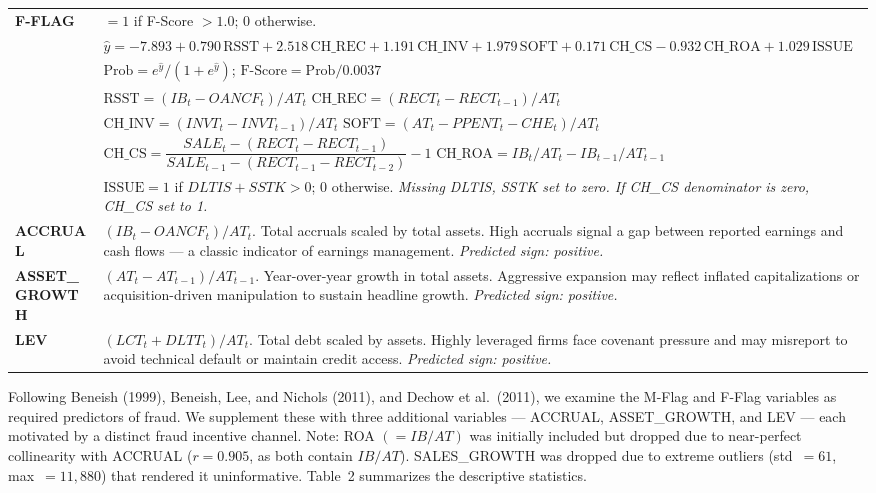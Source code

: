 \documentclass[12pt]{article}
\begin{document}
\begin{table}[h!]
\begin{tabular}{p{2.2cm} p{12.5cm}}
\textbf{F-FLAG} &
  $= 1$ if F-Score $> 1.0$; 0 otherwise.\\
  & $\hat{y} = -7.893 + 0.790\,\text{RSST} + 2.518\,\text{CH\_REC}
    + 1.191\,\text{CH\_INV} + 1.979\,\text{SOFT}
    + 0.171\,\text{CH\_CS} - 0.932\,\text{CH\_ROA} + 1.029\,\text{ISSUE}$\\[2pt]
  & $\text{Prob} = e^{\hat{y}}/(1+e^{\hat{y}})$;\quad
    $\text{F-Score} = \text{Prob}/0.0037$\\[2pt]
  & $\text{RSST} = (IB_t - OANCF_t)/AT_t$\quad
    $\text{CH\_REC} = (RECT_t - RECT_{t-1})/AT_t$\\[3pt]
  & $\text{CH\_INV} = (INVT_t - INVT_{t-1})/AT_t$\quad
    $\text{SOFT} = (AT_t - PPENT_t - CHE_t)/AT_t$\\[3pt]
  & $\text{CH\_CS} = \dfrac{SALE_t-(RECT_t-RECT_{t-1})}{SALE_{t-1}-(RECT_{t-1}-RECT_{t-2})} - 1$\quad
    $\text{CH\_ROA} = IB_t/AT_t - IB_{t-1}/AT_{t-1}$\\[3pt]
  & $\text{ISSUE} = 1$ if $DLTIS + SSTK > 0$; 0 otherwise.
    \textit{Missing DLTIS, SSTK set to zero. If CH\_CS denominator is zero, CH\_CS set to 1.}\\[8pt]

\textbf{ACCRUAL} &
  $(IB_t - OANCF_t)/AT_t$. Total accruals scaled by total assets.
  High accruals signal a gap between reported earnings and cash flows — a classic
  indicator of earnings management. \textit{Predicted sign: positive.}\\[6pt]

\textbf{ASSET\_GROWTH} &
  $(AT_t - AT_{t-1})/AT_{t-1}$. Year-over-year growth in total assets.
  Aggressive expansion may reflect inflated capitalizations or acquisition-driven
  manipulation to sustain headline growth. \textit{Predicted sign: positive.}\\[6pt]

\textbf{LEV} &
  $(LCT_t + DLTT_t)/AT_t$. Total debt scaled by assets.
  Highly leveraged firms face covenant pressure and may misreport to avoid
  technical default or maintain credit access. \textit{Predicted sign: positive.}\\

\bottomrule
\end{tabular}
\end{table}


\noindent
Following Beneish (1999), Beneish, Lee, and Nichols (2011), and Dechow et al.\ (2011),
we examine the M-Flag and F-Flag variables as required predictors of fraud.
We supplement these with three additional variables — ACCRUAL, ASSET\_GROWTH, and LEV
— each motivated by a distinct fraud incentive channel.
Note: ROA $(= IB/AT)$ was initially included but dropped due to near-perfect collinearity
with ACCRUAL ($r = 0.905$, as both contain $IB/AT$). SALES\_GROWTH was dropped due to
extreme outliers (std~$= 61$, max~$= 11{,}880$) that rendered it uninformative.
Table~2 summarizes the descriptive statistics.
\end{document}
